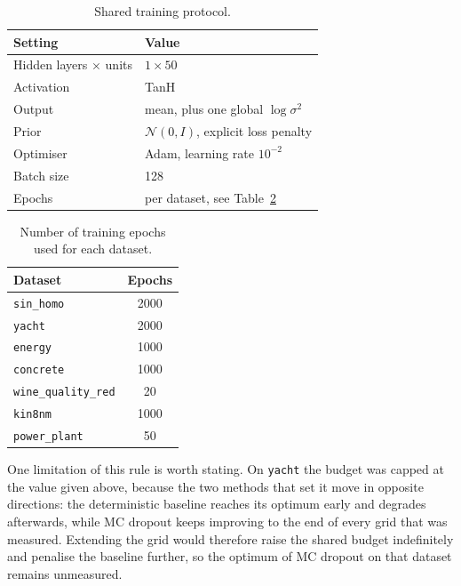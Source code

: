 \begin{table}[htbp]
    \centering
    \caption{Shared training protocol.}
    \label{tab:training-protocol}
    \begin{tabular}{ll}
        \hline
        Setting & Value \\
        \hline
        Hidden layers $\times$ units & $1 \times 50$ \\
        Activation                   & TanH \\
        Output                       & mean, plus one global $\log \sigma^2$ \\
        Prior                        & $\mathcal{N}(0, I)$, explicit loss penalty \\
        Optimiser                    & Adam, learning rate $10^{-2}$ \\
        Batch size                   & 128 \\
        Epochs                       & per dataset, see Table~\ref{tab:epochs} \\
        \hline
    \end{tabular}
\end{table}

\begin{table}[htbp]
    \centering
    \caption{Number of training epochs used for each dataset.}
    \label{tab:epochs}
    \begin{tabular}{lc}
        \hline
        Dataset & Epochs \\
        \hline
        \texttt{sin\_homo}         & 2000 \\
        \texttt{yacht}             & 2000 \\
        \texttt{energy}            & 1000 \\
        \texttt{concrete}          & 1000 \\
        \texttt{wine\_quality\_red}& 20   \\
        \texttt{kin8nm}            & 1000 \\
        \texttt{power\_plant}      & 50   \\
        \hline
    \end{tabular}
\end{table}

One limitation of this rule is worth stating. On \texttt{yacht} the budget was
capped at the value given above, because the two methods that set it move in
opposite directions: the deterministic baseline reaches its optimum early and
degrades afterwards, while MC dropout keeps improving to the end of every grid
that was measured. Extending the grid would therefore raise the shared budget
indefinitely and penalise the baseline further, so the optimum of MC dropout on
that dataset remains unmeasured.

